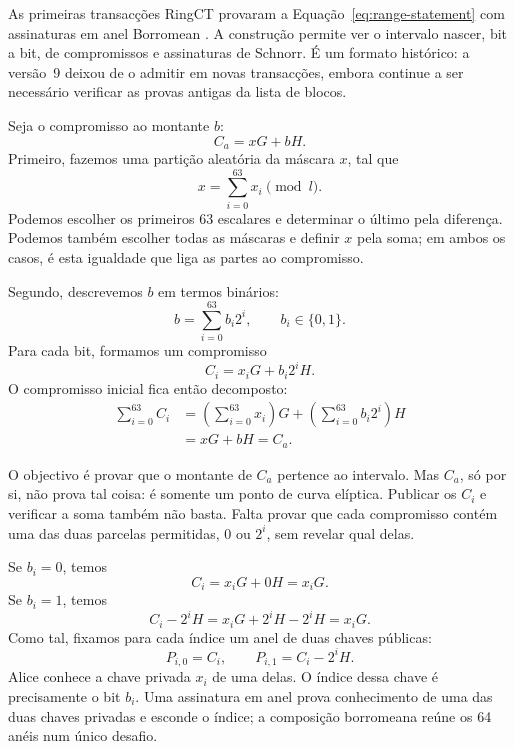%
As primeiras transacções RingCT provaram a
Equação~\eqref{eq:range-statement} com assinaturas em anel Borromean
\cite{Signatures2015BorromeanRS,MRL-0005-ringct}. A construção permite ver o
intervalo nascer, bit a bit, de compromissos e assinaturas de Schnorr. É um
formato histórico: a versão~9 deixou de o admitir em novas transacções, embora
continue a ser necessário verificar as provas antigas da lista de blocos.


Seja o compromisso ao montante \(b\):
\[
 C_a=xG+bH.
\]
Primeiro, fazemos uma partição aleatória da máscara \(x\), tal que
\[
 x=\sum_{i=0}^{63}x_i\pmod l.
\]
Podemos escolher os primeiros 63 escalares e determinar o último pela
diferença. Podemos também escolher todas as máscaras e definir \(x\) pela
soma; em ambos os casos, é esta igualdade que liga as partes ao compromisso.

Segundo, descrevemos \(b\) em termos binários:
\[
 b=\sum_{i=0}^{63}b_i2^i,\qquad b_i\in\{0,1\}.
\]
Para cada bit, formamos um compromisso
\begin{equation}
 C_i=x_iG+b_i2^iH.
 \label{eq:borromean-bit-commitment}
\end{equation}
O compromisso inicial fica então decomposto:
\begin{equation}
 \begin{split}
 \sum_{i=0}^{63}C_i
   &=\left(\sum_{i=0}^{63}x_i\right)G
     +\left(\sum_{i=0}^{63}b_i2^i\right)H\\
   &=xG+bH=C_a.
 \end{split}
 \label{eq:borromean-sum}
\end{equation}

O objectivo é provar que o montante de \(C_a\) pertence ao intervalo. Mas
\(C_a\), só por si, não prova tal coisa: é somente um ponto de curva
elíptica. Publicar os \(C_i\) e verificar a soma também não basta. Falta
provar que cada compromisso contém uma das duas parcelas permitidas,
\(0\) ou \(2^i\), sem revelar qual delas.

Se \(b_i=0\), temos
\[
 C_i=x_iG+0H=x_iG.
\]
Se \(b_i=1\), temos
\[
 C_i-2^iH=x_iG+2^iH-2^iH=x_iG.
\]
Como tal, fixamos para cada índice um anel de duas chaves públicas:
\begin{equation}
 P_{i,0}=C_i,\qquad P_{i,1}=C_i-2^iH.
 \label{eq:borromean-ring-pair}
\end{equation}
Alice conhece a chave privada \(x_i\) de uma delas. O índice dessa chave é
precisamente o bit \(b_i\). Uma assinatura em anel prova conhecimento de uma
das duas chaves privadas e esconde o índice; a composição borromeana reúne
os 64 anéis num único desafio.

